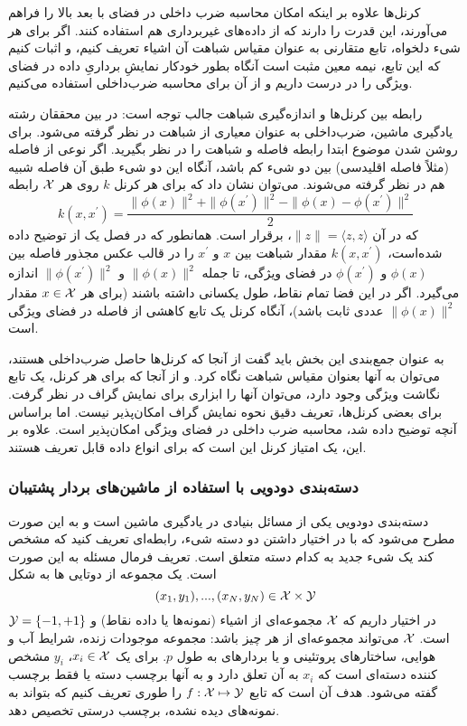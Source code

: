 کرنل‌ها علاوه بر اینکه امکان محاسبه ضرب داخلی در فضای با بعد بالا را فراهم می‌آورند، این قدرت را دارند که از داده‌های غیربرداری هم استفاده کنند. اگر برای هر شیء دلخواه، تابع متقارنی به عنوان مقیاس شباهت آن اشیاء تعریف کنیم، و اثبات کنیم که این تابع، نیمه معین مثبت است آنگاه بطور خودکار نمایشِ برداریِ داده در فضای ویژگی را در درست داریم و از آن برای محاسبه ضرب‌داخلی استفاده می‌کنیم.

رابطه بین کرنل‌ها و اندازه‌گیری شباهت جالب توجه است: در بین محققان رشته یادگیری ماشین، ضرب‌داخلی به عنوان معیاری از شباهت در نظر گرفته می‌شود. برای روشن شدن موضوع ابتدا رابطه فاصله و شباهت را در نظر بگیرید. اگر نوعی از فاصله (مثلاً فاصله اقلیدسی) بین دو شیء کم باشد، آنگاه این دو شیء طبق آن فاصله شبیه هم در نظر گرفته می‌شوند. می‌توان نشان داد که برای هر کرنل $k$ روی هر $\mathcal{X}$ رابطه
\begin{equation*}
k(x,x^\prime) = \dfrac{\|\phi(x)\|^2 + \|\phi(x^\prime)\|^2 - \|\phi(x) - \phi(x^\prime)\|^2}{2}
\end{equation*}
که در آن $\|z\| = \langle{z,z}\rangle$، برقرار است. همانطور که در فصل یک از  توضیح داده شده‌است، $k(x,x^\prime)$ مقدار شباهت بین $x$ و $x^\prime$ را در قالب عکس مجذور فاصله بین $\phi(x)$ و $\phi(x^\prime)$ در فضای ویژگی، تا جمله 
$\|\phi(x)\|^2$ و
$\|\phi(x^\prime)\|^2$
 اندازه می‌گیرد. اگر در این فضا تمام نقاط، طول یکسانی داشته باشند (برای هر $x \in \mathcal{X}$ مقدار $\|\phi(x)\|^2$ عددی ثابت باشد)، آنگاه کرنل یک تابع کاهشی از فاصله در فضای ویژگی است.

به عنوان جمع‌بندی این بخش باید گفت از آنجا که کرنل‌ها حاصل ضرب‌داخلی هستند، می‌توان به آنها بعنوان مقیاس شباهت نگاه کرد. و از آنجا که برای هر کرنل، یک تابع نگاشت ویژگی وجود دارد، می‌توان آنها را ابزاری برای نمایش گراف در نظر گرفت. برای بعضی کرنل‌ها، تعریف دقیق نحوه نمایش گراف امکان‌پذیر نیست. اما براساس آنچه توضیح داده شد، محاسبه ضرب داخلی در فضای ویژگی امکان‌پذیر است. علاوه بر این، یک امتیاز کرنل این است که برای انواع داده قابل تعریف هستند.

\subsubsection{دسته‌بندی دودویی با استفاده از ماشین‌های بردار پشتیبان}
دسته‌بندی دودویی یکی از مسائل بنیادی در یادگیری ماشین است و به این صورت مطرح می‌شود که با در اختیار داشتن دو دسته شیء، رابطه‌ای تعریف کنید که مشخص کند یک شیء‌ جدید به کدام دسته متعلق است. تعریف فرمال مسئله به این صورت است. یک مجموعه از دوتایی ها به شکل
\begin{equation*}
(x_1,y_1),...,(x_N,y_N) \in \mathcal{X} \times \mathcal{Y}
\end{equation*}
در اختیار داریم که $\mathcal{X}$ مجموعه‌ای از اشیاء (نمونه‌ها یا داده نقاط) و $\mathcal{Y} = \left\lbrace-1,+1 \right\rbrace$ است. $\mathcal{X}$ می‌تواند مجموعه‌ای از هر چیز باشد: مجموعه موجودات زنده، شرایط آب و هوایی، ساختارهای پروتئینی و یا بردارهای به طول $p$. برای یک $x_i \in \mathcal{X}$، $y_i$ مشخص کننده دسته‌ای است که $x_i$ به آن تعلق دارد و به آنها برچسب دسته یا فقط برچسب گفته می‌شود. هدف آن است که تابع $f: \mathcal{X} \mapsto \mathcal{Y}$ را طوری تعریف کنیم که بتواند به نمونه‌های دیده نشده، برچسب درستی تخصیص دهد.

